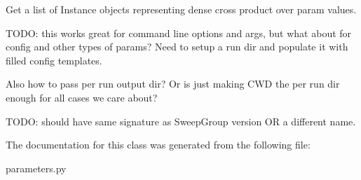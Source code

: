 \begin{DoxyVerb}Get a list of Instance objects representing dense cross product over
param values.

TODO: this works great for command line options and args, but
what about for config and other types of params? Need to setup
a run dir and populate it with filled config templates.

Also how to pass per run output dir? Or is just making CWD the
per run dir enough for all cases we care about?

TODO: should have same signature as SweepGroup version OR a
different name.
\end{DoxyVerb}
 

The documentation for this class was generated from the following file\+:\begin{DoxyCompactItemize}
\item 
parameters.\+py\end{DoxyCompactItemize}
